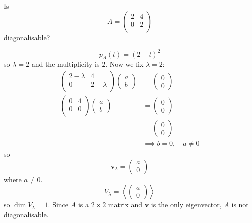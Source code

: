 \begin{example}
    Is
    \[
        A =
        \begin{pmatrix}
            2 & 4 \\
            0 & 2 \\
        \end{pmatrix}
    \]
    diagonalisable?
    
    \[ p_A(t) = (2 - t)^2 \]
    so $\lambda = 2$ and the multiplicity is $2$. Now we fix $\lambda = 2$:
    \begin{align*}
        \begin{pmatrix}
            2 - \lambda & 4 \\
            0 & 2 - \lambda \\
        \end{pmatrix}
        \begin{pmatrix}
            a \\ b
        \end{pmatrix}
        &=
        \begin{pmatrix}
            0 \\ 0
        \end{pmatrix}
        \\
        \begin{pmatrix}
            0 & 4 \\
            0 & 0 \\
        \end{pmatrix}
        \begin{pmatrix}
            a \\ b
        \end{pmatrix}
        &=
        \begin{pmatrix}
            0 \\ 0
        \end{pmatrix}
        \\
        &=
        \begin{pmatrix}
            0 \\ 0
        \end{pmatrix}
        \\
        & \implies b = 0, \quad a \neq 0
    \end{align*}
    so 
    \[
        \bm{v}_\lambda =
        \begin{pmatrix}
            a \\ 0
        \end{pmatrix}
    \]
    where $a \neq 0$. 
    \[ 
        V_\lambda = \left\langle
        \begin{pmatrix}
            a \\ 0
        \end{pmatrix}
        \right\rangle
    \]
    so $\dim{V_\lambda} = 1$. Since $A$ is a $2 \times 2$ matrix and $\bm{v}$ is the only eigenvector, $A$ is not diagonalisable.
\end{example}

